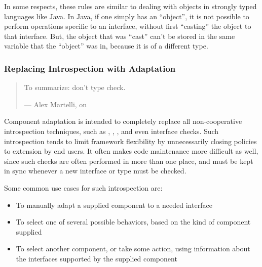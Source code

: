 In some respects, these rules are similar to dealing with objects in strongly
typed languages like Java.  In Java, if one simply has an ``object'', it is not
possible to perform operations specific to an interface, without first
``casting'' the object to that interface.  But, the object that was ``cast''
can't be stored in the same variable that the ``object'' was in, because it
is of a different type.


















\subsubsection{Replacing Introspection with Adaptation}

\begin{quotation}
To summarize: don't type check.

\hfill --- Alex Martelli, on 
\end{quotation}

Component adaptation is intended to completely replace all non-cooperative
introspection techniques, such as , ,
, and even interface checks.  Such introspection
tends to limit framework flexibility by unnecessarily closing policies to
extension by end users.  It often makes code maintenance more difficult as
well, since such checks are often performed in more than one place, and
must be kept in sync whenever a new interface or type must be checked.

Some common use cases for such introspection are:

\begin{itemize}

\item To manually adapt a supplied component to a needed interface

\item To select one of several possible behaviors, based on the kind of
component supplied

\item To select another component, or take some action, using information
about the interfaces supported by the supplied component

\end{itemize}

